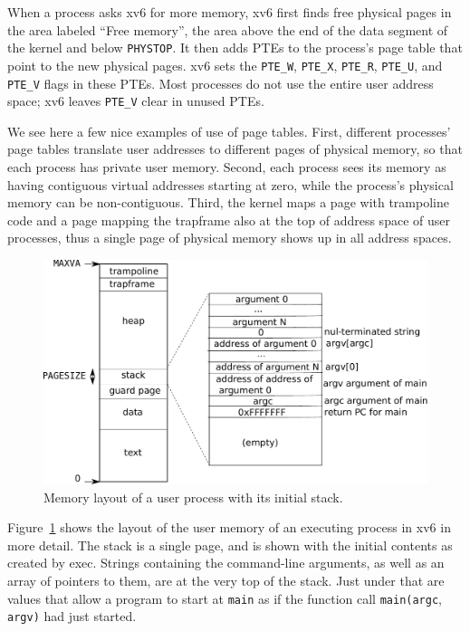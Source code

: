 When a process asks xv6 for more memory,
xv6 first finds free physical pages in the area
labeled ``Free memory'', the area above the end of the data segment
of the kernel and below
\texttt{PHYSTOP}.
It then adds PTEs to the process's page table that point
to the new physical pages.
xv6 sets the
\lstinline{PTE_W},
\lstinline{PTE_X},
\lstinline{PTE_R},
\lstinline{PTE_U},
and
\lstinline{PTE_V}
flags in these PTEs.
Most processes do not use the entire user address space;
xv6 leaves
\lstinline{PTE_V}
clear in unused PTEs.

We see here a few nice examples of use of page tables.  First,
different processes' page tables translate user addresses to different
pages of physical memory, so that each process has private user
memory.  Second, each process sees its memory as having contiguous
virtual addresses starting at zero, while the process's physical
memory can be non-contiguous.  Third, the kernel maps a page with
trampoline code and a page mapping the trapframe also at the top of
address space of user processes, thus a single page of physical memory
shows up in all address spaces.

\begin{figure}[t]
\center
\includegraphics[scale=0.5]{fig/processlayout.pdf}
\caption{Memory layout of a user process with its initial stack.}
\label{fig:processlayout}
\end{figure}

Figure~\ref{fig:processlayout} shows the layout of the user memory of
an executing process in xv6 in more detail.  The stack is a single
page, and is shown with the initial contents as created by exec.
Strings containing the command-line arguments, as well as an array of
pointers to them, are at the very top of the stack.  Just under that
are values that allow a program to start at \lstinline{main} as if the
function call \lstinline{main(argc}, \lstinline{argv)} had just
started.


